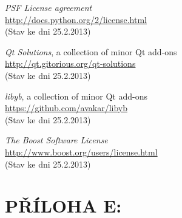 \documentclass[12pt, a4paper, oneside]{article}
\newcommand{\It}{\textit}  %
\begin{document}
\begin{thebibliography}{99}
     \It{PSF License agreement} \\
    \url{http://docs.python.org/2/license.html}\\
    (Stav ke dni 25.2.2013)

     \It{Qt Solutions}, a collection of minor Qt add-ons\\
    \url{http://qt.gitorious.org/qt-solutions}\\
    (Stav ke dni 25.2.2013)

     \It{libyb}, a collection of minor Qt add-ons\\
    \url{https://github.com/avakar/libyb}\\
    (Stav ke dni 25.2.2013)

     \It{The Boost Software License} \\
    \url{http://www.boost.org/users/license.html}\\
    (Stav ke dni 25.2.2013)

\end{thebibliography}

\newpage
\section*{PŘÍLOHA E:}
\listoffigures   %
\end{document}
